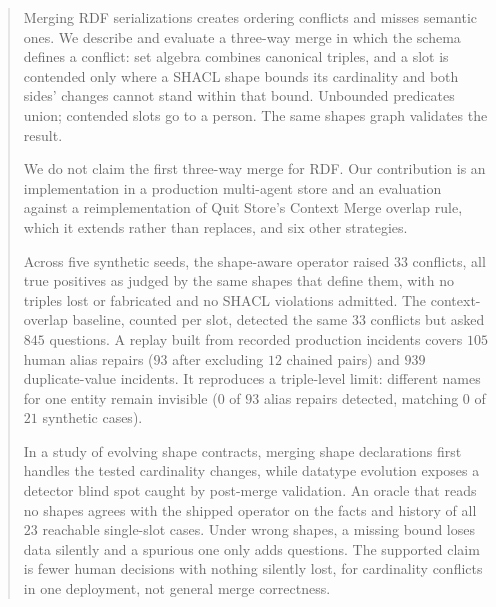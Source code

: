 \begin{abstract}
Merging RDF serializations creates ordering conflicts and misses semantic ones.
We describe and evaluate a three-way merge in which the schema defines a
conflict: set algebra combines canonical triples, and a slot is contended only
where a SHACL shape bounds its cardinality and both sides' changes cannot stand
within that bound. Unbounded predicates union; contended slots go to a person. The same shapes graph validates
the result.

We do not claim the first three-way merge for RDF. Our contribution is an
implementation in a production multi-agent store and an evaluation against
a reimplementation of Quit Store's Context Merge overlap rule, which it extends
rather than replaces, and six other strategies.

Across five synthetic seeds, the shape-aware operator raised $33$ conflicts,
all true positives as judged by the same shapes that define them, with no
triples lost or fabricated and no SHACL violations admitted. The context-overlap baseline, counted per slot, detected the same $33$ conflicts but
asked $845$ questions. A replay built from recorded production incidents covers $105$ human alias
repairs ($93$ after excluding $12$ chained pairs) and $939$ duplicate-value
incidents. It reproduces a triple-level limit: different names for one entity
remain invisible ($0$ of $93$ alias repairs detected, matching $0$ of $21$
synthetic cases).

In a study of evolving shape contracts, merging shape
declarations first handles the tested cardinality changes, while datatype
evolution exposes a detector blind spot caught by post-merge validation.
An oracle that reads no shapes agrees with the shipped operator on the facts
and history of all $23$ reachable single-slot cases. Under wrong shapes, a missing bound loses data silently
and a spurious one only adds questions. The supported claim is fewer
human decisions with nothing silently lost, for cardinality conflicts in one
deployment, not general merge correctness.
\end{abstract}
